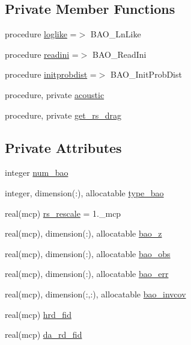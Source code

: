 \subsection*{Private Member Functions}
\begin{DoxyCompactItemize}
\item 
procedure \mbox{\hyperlink{structbao_1_1tbaolikelihood_af6f6eb8529e39d993c9dca4623ba676c}{loglike}} =$>$ B\+A\+O\+\_\+\+Ln\+Like
\item 
procedure \mbox{\hyperlink{structbao_1_1tbaolikelihood_af30e096816d4966f0320944f74557be3}{readini}} =$>$ B\+A\+O\+\_\+\+Read\+Ini
\item 
procedure \mbox{\hyperlink{structbao_1_1tbaolikelihood_a4bf32fc3a456bb7d0859cd8be52a18a6}{initprobdist}} =$>$ B\+A\+O\+\_\+\+Init\+Prob\+Dist
\item 
procedure, private \mbox{\hyperlink{structbao_1_1tbaolikelihood_a161999edfd8d171d71a43be82d350027}{acoustic}}
\item 
procedure, private \mbox{\hyperlink{structbao_1_1tbaolikelihood_a46dd77488cee6b36073be2384efb6e26}{get\+\_\+rs\+\_\+drag}}
\end{DoxyCompactItemize}
\subsection*{Private Attributes}
\begin{DoxyCompactItemize}
\item 
integer \mbox{\hyperlink{structbao_1_1tbaolikelihood_aefb092c52aa27ae4253884094450c045}{num\+\_\+bao}}
\item 
integer, dimension(\+:), allocatable \mbox{\hyperlink{structbao_1_1tbaolikelihood_a1d5539c2f8ddeaf61d71be7ad8021ea9}{type\+\_\+bao}}
\item 
real(mcp) \mbox{\hyperlink{structbao_1_1tbaolikelihood_a7570ca929fa00ced700ffb4e108d41bd}{rs\+\_\+rescale}} = 1.\+\_\+mcp
\item 
real(mcp), dimension(\+:), allocatable \mbox{\hyperlink{structbao_1_1tbaolikelihood_a76fc7e306508cd8c5916673aeafc5858}{bao\+\_\+z}}
\item 
real(mcp), dimension(\+:), allocatable \mbox{\hyperlink{structbao_1_1tbaolikelihood_a1f1e2dfd4f5d109af3ada9d862f14f91}{bao\+\_\+obs}}
\item 
real(mcp), dimension(\+:), allocatable \mbox{\hyperlink{structbao_1_1tbaolikelihood_a935bce25427286b5efe045f41d4384a9}{bao\+\_\+err}}
\item 
real(mcp), dimension(\+:,\+:), allocatable \mbox{\hyperlink{structbao_1_1tbaolikelihood_acdc096e03d6ebe2c9c0f01c744a01594}{bao\+\_\+invcov}}
\item 
real(mcp) \mbox{\hyperlink{structbao_1_1tbaolikelihood_a84f1a1b4ea6cddcd6cd69c9eba1e53c8}{hrd\+\_\+fid}}
\item 
real(mcp) \mbox{\hyperlink{structbao_1_1tbaolikelihood_ac1af5d9f8bf442c2de67bf477ff5931b}{da\+\_\+rd\+\_\+fid}}
\end{DoxyCompactItemize}


